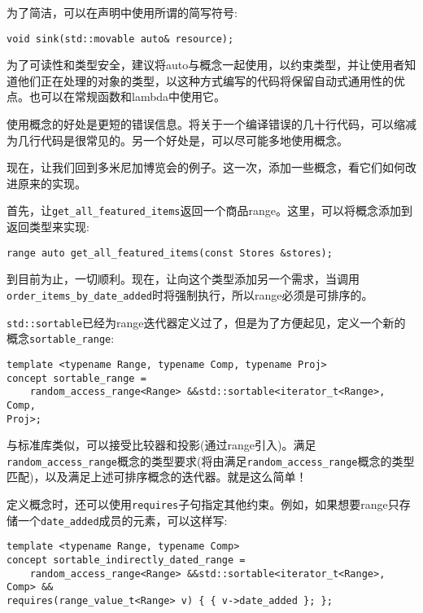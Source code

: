 为了简洁，可以在声明中使用所谓的简写符号:

\begin{lstlisting}[style=styleCXX]
void sink(std::movable auto& resource);
\end{lstlisting}

为了可读性和类型安全，建议将auto与概念一起使用，以约束类型，并让使用者知道他们正在处理的对象的类型，以这种方式编写的代码将保留自动式通用性的优点。也可以在常规函数和lambda中使用它。

使用概念的好处是更短的错误信息。将关于一个编译错误的几十行代码，可以缩减为几行代码是很常见的。另一个好处是，可以尽可能多地使用概念。

现在，让我们回到多米尼加博览会的例子。这一次，添加一些概念，看它们如何改进原来的实现。

首先，让\texttt{get\_all\_featured\_items}返回一个商品range。这里，可以将概念添加到返回类型来实现:

\begin{lstlisting}[style=styleCXX]
range auto get_all_featured_items(const Stores &stores);
\end{lstlisting}

到目前为止，一切顺利。现在，让向这个类型添加另一个需求，当调用\texttt{order\_items\_by\_date\_added}时将强制执行，所以range必须是可排序的。

\texttt{std::sortable}已经为range迭代器定义过了，但是为了方便起见，定义一个新的概念\texttt{sortable\_range}:

\begin{lstlisting}[style=styleCXX]
template <typename Range, typename Comp, typename Proj>
concept sortable_range =
	random_access_range<Range> &&std::sortable<iterator_t<Range>, Comp,
Proj>;
\end{lstlisting}

与标准库类似，可以接受比较器和投影(通过range引入)。满足\texttt{random\_access\_range}概念的类型要求(将由满足\texttt{random\_access\_range}概念的类型匹配)，以及满足上述可排序概念的迭代器。就是这么简单！

定义概念时，还可以使用\texttt{requires}子句指定其他约束。例如，如果想要range只存储一个\texttt{date\_added}成员的元素，可以这样写:

\begin{lstlisting}[style=styleCXX]
template <typename Range, typename Comp>
concept sortable_indirectly_dated_range =
	random_access_range<Range> &&std::sortable<iterator_t<Range>, Comp> &&
requires(range_value_t<Range> v) { { v->date_added }; };
\end{lstlisting}

